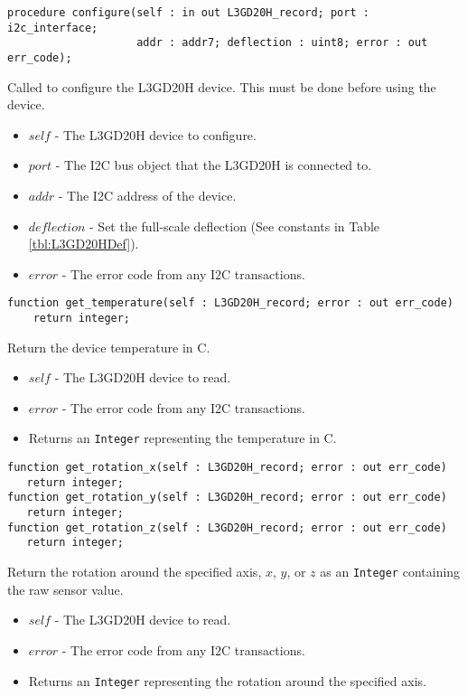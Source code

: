 \documentclass[10pt, openany]{book}
\newcommand{\datatype}[1]{\texttt{#1}}
\begin{document}
\begin{lstlisting}
procedure configure(self : in out L3GD20H_record; port : i2c_interface;
                    addr : addr7; deflection : uint8; error : out err_code);
\end{lstlisting}
Called to configure the L3GD20H device.  This must be done before using the device.
\begin{itemize}
  \item $self$ - The L3GD20H device to configure.
  \item $port$ - The I2C bus object that the L3GD20H is connected to.
  \item $addr$ - The I2C address of the device.
  \item $deflection$ - Set the full-scale deflection (See constants in Table \ref{tbl:L3GD20HDef}).
  \item $error$ - The error code from any I2C transactions.
\end{itemize}

\begin{lstlisting}
function get_temperature(self : L3GD20H_record; error : out err_code)
    return integer;
\end{lstlisting}
Return the device temperature in \degree{}C.
\begin{itemize}
  \item $self$ - The L3GD20H device to read.
  \item $error$ - The error code from any I2C transactions.
  \item Returns an \datatype{Integer} representing the temperature in \degree{}C.
\end{itemize}

\begin{lstlisting}
function get_rotation_x(self : L3GD20H_record; error : out err_code)
   return integer;
function get_rotation_y(self : L3GD20H_record; error : out err_code)
   return integer;
function get_rotation_z(self : L3GD20H_record; error : out err_code)
   return integer;
\end{lstlisting}
Return the rotation around the specified axis, $x$, $y$, or $z$ as an \datatype{Integer} containing the raw sensor value.
\begin{itemize}
  \item $self$ - The L3GD20H device to read.
  \item $error$ - The error code from any I2C transactions.
  \item Returns an \datatype{Integer} representing the rotation around the specified axis.
\end{itemize}
\end{document}
